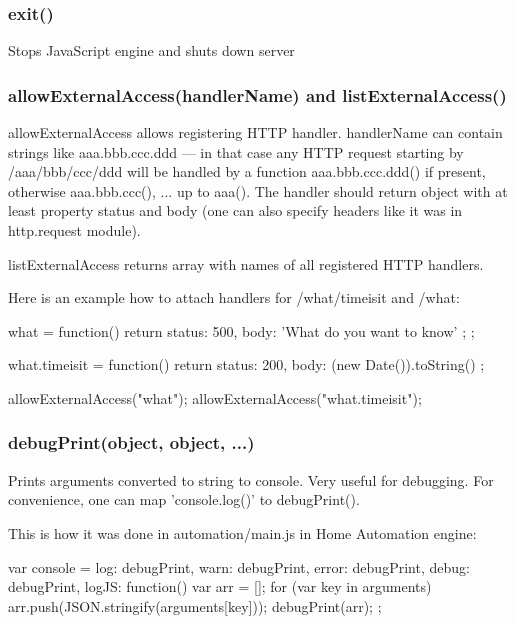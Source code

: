 \subsubsection{exit()}
Stops JavaScript engine and shuts down \zway server


\subsubsection{allowExternalAccess(handlerName) and listExternalAccess()}
allowExternalAccess allows registering HTTP handler. handlerName can contain strings like 
aaa.bbb.ccc.ddd --- in that case any HTTP request starting by /aaa/bbb/ccc/ddd will be 
handled by a function aaa.bbb.ccc.ddd() if present, otherwise aaa.bbb.ccc(), ... up to aaa().
The handler should return object with at least property status and body (one can also specify 
headers like it was in http.request module).

listExternalAccess returns array with names of all registered HTTP handlers.

Here is an example how to attach handlers for /what/timeisit and /what:

\begin{listingverbatim}
what = function() {
  return { status: 500, body: 'What do you want to know' };
};

what.timeisit = function() {
  return { status: 200, body: (new Date()).toString() }
};

allowExternalAccess("what");
allowExternalAccess("what.timeisit");
\end{listingverbatim}

\subsubsection{debugPrint(object, object, ...)}

Prints arguments converted to string to \zway console. Very useful for debugging.
For convenience, one can map 'console.log()' to debugPrint().

This is how it was done in automation/main.js in \zway Home Automation engine:
\begin{listingverbatim}
var console = {
    log: debugPrint,
    warn: debugPrint,
    error: debugPrint,
    debug: debugPrint,
    logJS: function() {
        var arr = [];
        for (var key in arguments)
            arr.push(JSON.stringify(arguments[key]));
        debugPrint(arr);
    }
};
\end{listingverbatim}

